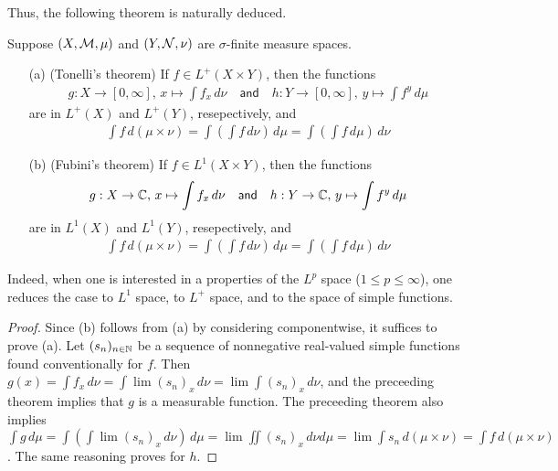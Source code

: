 Thus, the following theorem is naturally deduced.
\begin{thm}
    Suppose $(X, {\mathcal{M}}, \mu)$ and $(Y, {\mathcal{N}}, \nu)$ are $\sigma$-finite measure spaces.
    \begin{enumerate}
        \item[(a)]
        {
            (Tonelli's theorem)
            If $f\in L^+(X\times Y)$, then the functions
            \begin{align*}
                g: X\rightarrow[0, \infty],\, x\mapsto\int f_x\,d\nu
                \quad\textsf{and}\quad
                h: Y\rightarrow[0, \infty],\, y\mapsto\int f^y\,d\mu
            \end{align*}
            are in $L^+(X)$ and $L^+(Y)$, resepectively, and
            \begin{align*}
                \int f\,d(\mu\times\nu)=\int\left(\int f\,d\nu\right)\,d\mu=\int\left(\int f\,d\mu\right)\,d\nu
            \end{align*}
        }
        \item[(b)]
        {
            (Fubini's theorem)
            If $f\in L^1(X\times Y)$, then the functions
            \begin{align*}
                g: X\rightarrow{\mathbb{C}},\, x\mapsto\int f_x\,d\nu
                \quad\textsf{and}\quad
                h: Y\rightarrow{\mathbb{C}},\, y\mapsto\int f^y\,d\mu
            \end{align*}
            are in $L^1(X)$ and $L^1(Y)$, resepectively, and
            \begin{align*}
                \int f\,d(\mu\times\nu)=\int\left(\int f\,d\nu\right)\,d\mu=\int\left(\int f\,d\mu\right)\,d\nu
            \end{align*}
        }
    \end{enumerate}
\end{thm}
\begin{rmk}
    Indeed, when one is interested in a properties of the $L^p$ space ($1\leq p\leq\infty$), one reduces the case to $L^1$ space, to $L^+$ space, and to the space of simple functions.
\end{rmk}
\begin{proof}
    Since (b) follows from (a) by considering componentwise, it suffices to prove (a).
    Let $(s_n)_{n\in{\mathbb{N}}}$ be a sequence of nonnegative real-valued simple functions found conventionally for $f$.
    Then $g(x)=\int f_x\,d\nu=\int\lim(s_n)_x\,d\nu=\lim\int(s_n)_x\,d\nu$, and the preceeding theorem implies that $g$ is a measurable function.
    The preceeding theorem also implies $\int g\,d\mu=\int\left(\int\lim(s_n)_x\,d\nu\right)\,d\mu=\lim\iint (s_n)_x\,d\nu d\mu=\lim\int s_n\,d(\mu\times\nu)=\int f\,d(\mu\times\nu)$.
    The same reasoning proves for $h$.
\end{proof}

